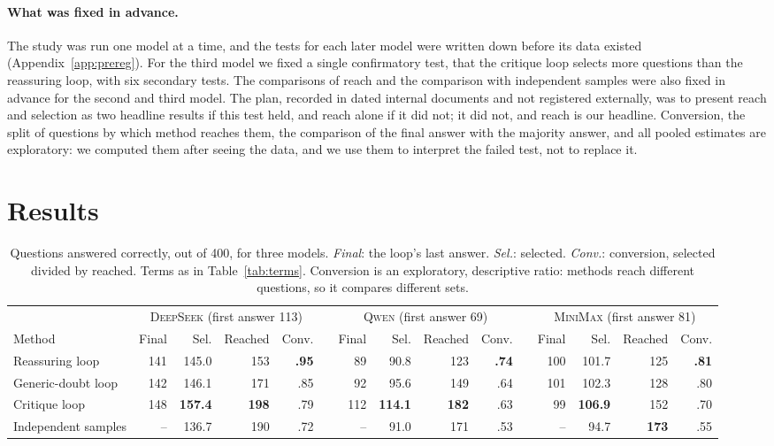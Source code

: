 \documentclass[11pt]{article}
\newcommand{\ds}{\textsc{DeepSeek}}
\newcommand{\qw}{\textsc{Qwen}}
\newcommand{\mm}{\textsc{MiniMax}}
\begin{document}
\paragraph{What was fixed in advance.}
The study was run one model at a time, and the tests for each later model were written down before its data existed (Appendix~\ref{app:prereg}).
For the third model we fixed a single confirmatory test, that the critique loop selects more questions than the reassuring loop, with six secondary tests.
The comparisons of reach and the comparison with independent samples were also fixed in advance for the second and third model.
The plan, recorded in dated internal documents and not registered externally, was to present reach and selection as two headline results if this test held, and reach alone if it did not; it did not, and reach is our headline.
Conversion, the split of questions by which method reaches them, the comparison of the final answer with the majority answer, and all pooled estimates are exploratory: we computed them after seeing the data, and we use them to interpret the failed test, not to replace it.

\section{Results}

\begin{table}[t]
\centering
\small
\setlength{\tabcolsep}{3.4pt}
\begin{tabular}{@{}l rrrr c rrrr c rrrr@{}}
\toprule
 & \multicolumn{4}{c}{\ds{} (first answer 113)} & & \multicolumn{4}{c}{\qw{} (first answer 69)} & & \multicolumn{4}{c}{\mm{} (first answer 81)} \\
\cmidrule(lr){2-5}\cmidrule(lr){7-10}\cmidrule(l){12-15}
Method & Final & Sel. & Reached & Conv. & & Final & Sel. & Reached & Conv. & & Final & Sel. & Reached & Conv. \\
\midrule
Reassuring loop & 141 & 145.0 & 153 & \textbf{.95} & & 89 & 90.8 & 123 & \textbf{.74} & & 100 & 101.7 & 125 & \textbf{.81} \\
Generic-doubt loop & 142 & 146.1 & 171 & .85 & & 92 & 95.6 & 149 & .64 & & 101 & 102.3 & 128 & .80 \\
Critique loop & 148 & \textbf{157.4} & \textbf{198} & .79 & & 112 & \textbf{114.1} & \textbf{182} & .63 & & 99 & \textbf{106.9} & 152 & .70 \\
Independent samples & -- & 136.7 & 190 & .72 & & -- & 91.0 & 171 & .53 & & -- & 94.7 & \textbf{173} & .55 \\
\bottomrule
\end{tabular}
\caption{Questions answered correctly, out of 400, for three models. \emph{Final}: the loop's last answer. \emph{Sel.}: selected. \emph{Conv.}: conversion, selected divided by reached. Terms as in Table~\ref{tab:terms}. Conversion is an exploratory, descriptive ratio: methods reach different questions, so it compares different sets.}
\label{tab:main}
\end{table}
\end{document}

